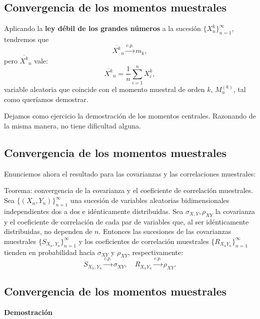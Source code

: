 \documentclass[]{book}
\begin{document}
\hypertarget{convergencia-de-los-momentos-muestrales-7}{%
\subsection{Convergencia de los momentos muestrales}\label{convergencia-de-los-momentos-muestrales-7}}

Aplicando la \textbf{ley débil de los grandes números} a la sucesión \(\{X_n^k\}_{n=1}^\infty\), tendremos que
\[
\overline{X^k}_n \stackrel{c.p.}{\longrightarrow}m_k,
\]
pero \(\overline{X^k}_n\) vale:
\[
\overline{X^k}_n=\frac{1}{n}\sum_{i=1}^n X_i^k,
\]
variable aleatoria que coincide con el momento muestral de orden \(k\), \(M_n^{(k)}\), tal como queríamos demostrar.

Dejamos como ejercicio la demostración de los momentos centrales. Razonando de la misma manera, no tiene dificultad alguna.

\hypertarget{convergencia-de-los-momentos-muestrales-8}{%
\subsection{Convergencia de los momentos muestrales}\label{convergencia-de-los-momentos-muestrales-8}}

Enunciemos ahora el resultado para las covarianzas y las correlaciones muestrales:

 Teorema: convergencia de la covarianza y el coeficiente de correlación muestrales.
Sea \(\{(X_n,Y_n)\}_{n=1}^\infty\) una sucesión de variables aleatorias bidimensionales independientes dos a dos e idénticamente distribuidas.
Sea \(\sigma_{X,Y}, \rho_{XY}\) la covarianza y el coeficiente de correlación de cada par de variables que, al ser idénticamente distribuidas, no dependen de \(n\). Entonces las sucesiones de las covarianzas muestrales \(\{S_{X_n,Y_n}\}_{n=1}^\infty\) y los coeficientes de correlación muestrales \(\{R_{X_nY_n}\}_{n=1}^\infty\) tienden en probabilidad hacia \(\sigma_{XY}\) y \(\rho_{XY}\), respectivamente:
\[
S_{X_n,Y_n}\stackrel{c.p.}{\longrightarrow}\sigma_{XY},\quad R_{X_nY_n}\stackrel{c.p.}{\longrightarrow}\rho_{XY}.
\]

\hypertarget{convergencia-de-los-momentos-muestrales-9}{%
\subsection{Convergencia de los momentos muestrales}\label{convergencia-de-los-momentos-muestrales-9}}

\textbf{Demostración}
\end{document}
